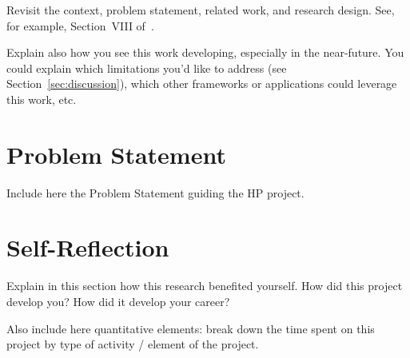 \documentclass[11pt]{article}
\begin{document}
Revisit the context, problem statement, related work, and research design. See, for example, Section~VIII of~\cite{DBLP:conf/sc/AndreadisVMI18}.

Explain also how you see this work developing, especially in the near-future. You could explain which limitations you'd like to address (see Section~\ref{sec:discussion}), which other frameworks or applications could leverage this work, etc.






\appendix

\section{Problem Statement} \label{app:problemstatement}

Include here the Problem Statement guiding the HP project.

\section{Self-Reflection} \label{app:selfreflection}

Explain in this section how this research benefited yourself. How did this project develop you? How did it develop your career? 

Also include here quantitative elements: break down the time spent on this project by type of activity / element of the project.
\end{document}
